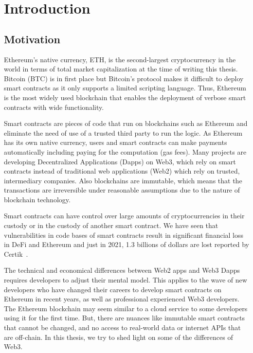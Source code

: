 \chapter{Introduction}


\section{Motivation}
Ethereum's native currency, ETH, is the second-largest cryptocurrency in the world in terms of total market capitalization at the time of writing this thesis. Bitcoin (BTC) is in first place but Bitcoin's protocol makes it difficult to deploy smart contracts as it only supports a limited scripting language. Thus, Ethereum is the most widely used blockchain that enables the deployment of verbose smart contracts with wide functionality. 

Smart contracts are pieces of code that run on blockchains such as Ethereum and eliminate the need of use of a trusted third party to run the logic. As Ethereum has its own native currency, users and smart contracts can make payments automatically including paying for the computation (gas fees).
Many projects are developing Decentralized Applications (Dapps) on Web3, which rely on smart contracts instead of traditional web applications (Web2) which rely on trusted, intermediary companies.
Also blockchains are immutable, which means that the transactions are irreversible under reasonable assumptions due to the nature of blockchain technology. 

Smart contracts can have control over large amounts of cryptocurrencies in their custody or in the custody of another smart contract. We have seen that vulnerabilities in code bases of smart contracts result in significant financial loss in DeFi and Ethereum and just in 2021, 1.3 billions of dollars are lost reported by Certik~\cite{certikReport}.

The technical and economical differences between Web2 apps and Web3 Dapps requires developers to adjust their mental model. This applies to the wave of new developers who have changed their careers to develop smart contracts on Ethereum in recent years, as well as professional experienced Web3 developers. The Ethereum blockchain may seem similar to a cloud service to some developers using it for the first time. But, there are nuances like immutable smart contracts that cannot be changed, and no access to real-world data or internet APIs that are off-chain. In this thesis, we try to shed light on some of the differences of Web3.


